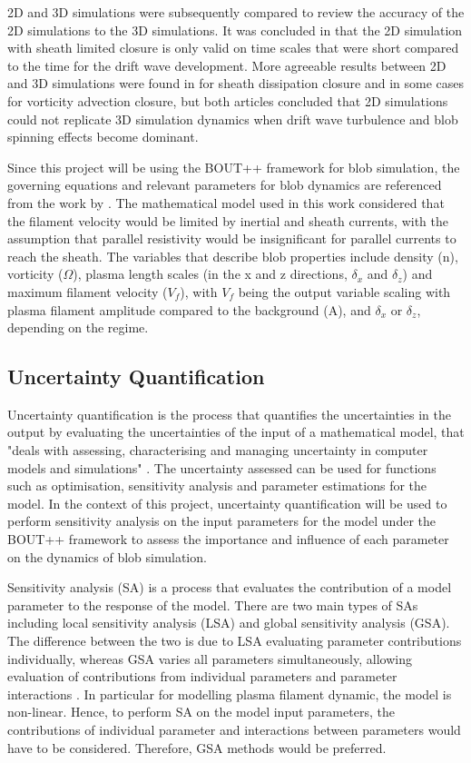 \documentclass{article}
\begin{document}
2D and 3D simulations were subsequently compared to review the accuracy of the 2D simulations to the 3D simulations. It was concluded in \cite{angus_3d_2012} that the 2D simulation with sheath limited closure is only valid on time scales that were short compared to the time for the drift wave development. More agreeable results between 2D and 3D simulations were found in \cite{easy_three_2014} for sheath dissipation closure and in some cases for vorticity advection closure, but both articles concluded that 2D simulations could not replicate 3D simulation dynamics when drift wave turbulence and blob spinning effects become dominant.

Since this project will be using the BOUT++ framework \cite{dudson_bout_2009} for blob simulation, the governing equations and relevant parameters for blob dynamics are referenced from the work by \cite{omotani_effects_2015}. The mathematical model used in this work considered that the filament velocity would be limited by inertial and sheath currents, with the assumption that parallel resistivity would be insignificant for parallel currents to reach the sheath. The variables that describe blob properties include density (n), vorticity ($\Omega$), plasma length scales (in the x and z directions, $\delta_x$ and $\delta_z$) and maximum filament velocity ($V_f$), with $V_f$ being the output variable scaling with plasma filament amplitude compared to the background (A), and $\delta_x$ or $\delta_z$, depending on the regime.  

\subsection*{Uncertainty Quantification}
Uncertainty quantification is the process that quantifies the uncertainties in the output by evaluating the uncertainties of the input of a mathematical model, that "deals with assessing, characterising and managing uncertainty in computer models and simulations" \cite{wu_chapter_2024,li_gaussian_2025}. The uncertainty assessed can be used for functions such as optimisation, sensitivity analysis and parameter estimations for the model. In the context of this project, uncertainty quantification will be used to perform sensitivity analysis on the input parameters for the model under the BOUT++ framework to assess the importance and influence of each parameter on the dynamics of blob simulation.

Sensitivity analysis (SA) is a process that evaluates the contribution of a model parameter to the response of the model. There are two main types of SAs including local sensitivity analysis (LSA) and global sensitivity analysis (GSA). The difference between the two is due to LSA evaluating parameter contributions individually, whereas GSA varies all parameters simultaneously, allowing evaluation of contributions from individual parameters and parameter interactions \cite{tosin_tutorial_2020, zhang_sobol_2015}. In particular for modelling plasma filament dynamic, the model is non-linear. Hence, to perform SA on the model input parameters, the contributions of individual parameter and interactions between parameters would have to be considered. Therefore, GSA methods would be preferred. 
\end{document}

